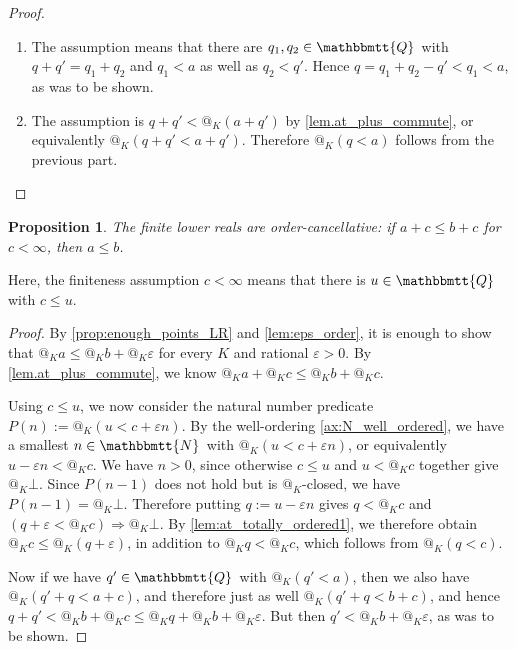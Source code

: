 \documentclass[11pt, oneside, article]{memoir}
\makeatletter
\theoremstyle{plain}
\newtheorem{proposition}[theorem]{Proposition}
\theoremstyle{definition}
\theoremstyle{remark}
\newcommand{\internal}[1]{\raisebox{-.03ex}{$\mathbbmtt{#1}$}}
\newcommand{\hs}{\hspace{1.1pt}}
\newcommand{\tNN}{\internal{N}\hs}
\newcommand{\tQQ}{\internal{Q}\hs}
\newcommand{\AtSymbol}{{@}}
\newcommand{\At}[2][]{\AtSymbol^{#1}_{#2}}
\newcommand{\imp}{\Rightarrow}
\makeatother
\begin{document}
\begin{proof}
	\begin{enumerate}
		\item The assumption means that there are $q_1,q_2\in\tQQ$ with $q + q' = q_1 + q_2$ and $q_1 < a$ as well as $q_2 < q'$. Hence $q = q_1 + q_2 - q' < q_1 < a$, as was to be shown.
		\item The assumption is $q + q' < \At{K}(a + q')$ by \cref{lem.at_plus_commute}, or equivalently $\At{K}(q + q' < a + q')$. Therefore $\At{K}(q < a)$ follows from the previous part.
	\end{enumerate}
\end{proof}


\begin{proposition}\label{prop.order_canc}
The finite lower reals are order-cancellative: if $a+c\leq b+c$ for $c < \infty$, then $a\leq b$.
\end{proposition}

Here, the finiteness assumption $c < \infty$ means that there is $u \in \tQQ$ with $c \leq u$.

\begin{proof}
	By \cref{prop:enough_points_LR} and \cref{lem:eps_order}, it is enough to show that $\At{K} a \leq \At{K} b + \At{K} \varepsilon$ for every $K$ and rational $\varepsilon > 0$. By \cref{lem.at_plus_commute}, we know $\At{K} a + \At{K} c \leq \At{K} b + \At{K} c$.

	Using $c \leq u$, we now consider the natural number predicate $P(n) := \At{K} (u < c + \varepsilon n)$. By the well-ordering \cref{ax:N_well_ordered}, we have a smallest $n \in \tNN$ with $\At{K}(u < c + \varepsilon n)$, or equivalently $u - \varepsilon n < \At{K} c$. We have $n > 0$, since otherwise $c \leq u$ and $u < \At{K} c$ together give $\At{K}\bot$. Since $P(n-1)$ does not hold but is $\At{K}$-closed, we have $P(n-1) = \At{K} \bot$. Therefore putting $q := u - \varepsilon n$ gives $q < \At{K} c$ and $(q + \varepsilon < \At{K} c) \imp \At{K} \bot$. By \cref{lem:at_totally_ordered1}, we therefore obtain $\At{K} c \leq \At{K}(q + \varepsilon)$, in addition to $\At{K} q < \At{K} c$, which follows from $\At{K}(q < c)$.

	Now if we have $q'\in\tQQ$ with $\At{K}(q' < a)$, then we also have $\At{K}(q' + q < a + c)$, and therefore just as well $\At{K}(q' + q < b + c)$, and hence $q + q' < \At{K} b + \At{K} c \leq \At{K} q + \At{K} b + \At{K} \varepsilon$. But then $q' < \At{K} b + \At{K} \varepsilon$, as was to be shown.
\end{proof}
\end{document}
